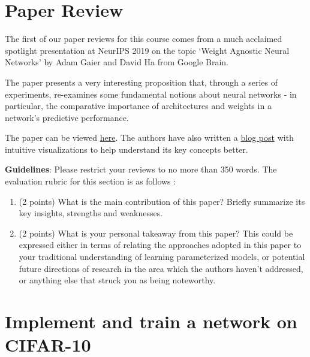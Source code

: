 \documentclass[11pt,english]{article}
\begin{document}
\section{Paper Review}

The first of our paper reviews for this course comes from a much acclaimed spotlight presentation at NeurIPS 2019 on the topic `Weight Agnostic Neural Networks' by Adam Gaier and David Ha from Google Brain. 

The paper presents a very interesting proposition that, through a series of experiments, re-examines some fundamental notions about neural networks - in particular, the comparative importance of architectures and weights in a network's predictive performance. 

The paper can be viewed \href{https://arxiv.org/abs/1906.04358}{here}.
The authors have also written a \href{https://weightagnostic.github.io/}{blog post} with intuitive visualizations to help understand its key concepts better. 

\textbf{Guidelines}: Please restrict your reviews to no more than 350 words. The evaluation rubric for this section is as follows :
\begin{enumerate}[resume]
\item (2 points) What is the main contribution of this paper? Briefly summarize its key insights, strengths and weaknesses.

\item (2 points) What is your personal takeaway from this paper? This could be expressed either in terms of relating the approaches adopted in this paper to your traditional understanding of learning parameterized models, or potential future directions of research in the area which the authors haven't addressed, or anything else that struck you as being noteworthy. 
\end{enumerate}


\section{Implement and train a network on CIFAR-10}
\end{document}
